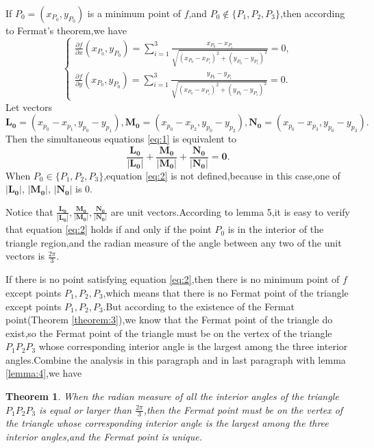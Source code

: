 \documentclass{amsart}
\theoremstyle{plain}
\newtheorem{theorem}{Theorem}
\theoremstyle{definition}
\begin{document}
If $P_0=(x_{P_{0}},y_{P_{0}})$ is a minimum point of $f$,and $P_0\not\in \{P_1,P_2,P_3\}$,then
according to Fermat's theorem,we have
\begin{equation}\label{eq:1}
  \begin{cases}
          \displaystyle\frac{\partial f}{\partial x}(x_{P_{0}},y_{P_{0}})=\sum_{i=1}^3
  \frac{x_{P_{0}}-x_{P_{i}}}{\sqrt{(x_{P_{0}}-x_{P_{i}})^2+(y_{P_{0}}-y_{P_{i}})^2}}=0,\\
\displaystyle\frac{\partial f}{\partial
    y}(x_{P_{0}},y_{P_{0}})=\sum_{i=1}^3 \frac{y_{P_{0}}-y_{P_{i}}}{\sqrt{(x_{P_{0}}-x_{P_{i}})^2+(y_{P_{0}}-y_{P_{i}})^2}}=0.
  \end{cases}
\end{equation}
Let vectors
$$
\mathbf{L_{0}}=(x_{p_{0}}-x_{p_{1}},y_{p_{0}}-y_{p_{1}}),\mathbf{M_{0}}=(x_{p_{0}}-x_{p_{2}},y_{p_{0}}-y_{p_{2}}),\mathbf{N_{0}}=(x_{p_{0}}-x_{p_{3}},y_{p_{0}}-y_{p_{3}}).
$$
Then the simultaneous equations \eqref{eq:1} is equivalent to
\begin{equation}
  \label{eq:2}
\mathbf{\frac{L_{0}}{|L_{0}|}+\frac{M_{0}}{|M_{0}|}+\frac{N_{0}}{|N_{0}|}}=\mathbf{0}.
\end{equation}
When $P_0\in \{P_1,P_2,P_3\}$,equation \eqref{eq:2} is not
defined,because in this case,one of  $|\mathbf{L_{0}}|$,
$|\mathbf{M_{0}}|$,  $|\mathbf{N_0}|$ is $0$.

Notice that 
$\frac{\mathbf{L_0}}{|\mathbf{L_0}|},\frac{\mathbf{M_0}}{|\mathbf{M_0}|},\frac{\mathbf{N_0}}{|\mathbf{N_0}|}$
are unit vectors.According to lemma 5,it is easy to verify that equation
\eqref{eq:2} holds if and only if the point $P_0$ is in the interior of the
triangle region,and the radian measure of the angle between any
two of the unit vectors is $\frac{2\pi}{3}$.

If there is no point satisfying equation \eqref{eq:2},then there is no minimum point of $f$ except points
$P_1,P_2,P_{3}$,which means that there is no Fermat point of the triangle except
points $P_1,P_2,P_3$.But according to the existence of the Fermat
point(Theorem \eqref{theorem:3}),we
know that the Fermat point of the triangle do exist,so the Fermat point of the triangle must be on the vertex of the triangle
$P_1P_2P_3$ whose corresponding interior angle is the
largest among the three interior angles.Combine the analysis in this
paragraph and in last paragraph with  lemma
\eqref{lemma:4},we have


\begin{theorem}\label{theorem:9}
When the radian measure of all the interior angles of the triangle $P_1P_2P_3$
is equal or larger than $\frac{2\pi}{3}$,then the Fermat point must be on the vertex of
the triangle whose corresponding interior angle is the largest among
the three interior angles,and the Fermat point is unique.
\end{theorem}
\end{document}
